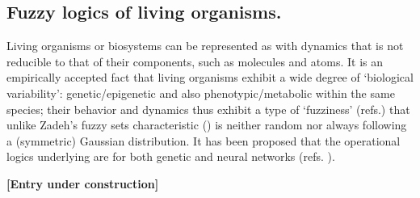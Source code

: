 \documentclass[12pt]{article}
\theoremstyle{plain}
\theoremstyle{definition}
\numberwithin{equation}{section}
\begin{document}
\subsection{Fuzzy logics of living organisms.}
Living organisms or biosystems can be represented as 
 with dynamics
that is not reducible to that of their components, such as molecules and atoms. It is an
empirically accepted fact that living organisms exhibit a wide degree of `biological variability': 
genetic/epigenetic and also phenotypic/metabolic within the same species; their behavior 
and dynamics thus exhibit a type of `fuzziness' (refs.\cite{ICBM1,ICB77}) that unlike Zadeh's 
fuzzy sets characteristic (\cite{ZLA1,ZLA2}) is neither random nor always following a (symmetric) Gaussian distribution. 
It has been proposed that the operational logics underlying 
 are
 for both genetic 
and neural networks (refs. \cite{ICB77,ICB2k4}). 


{\bf [Entry under construction]}
\end{document}
